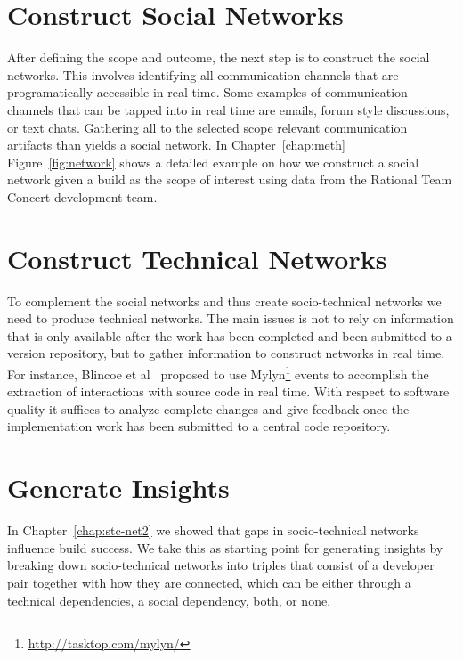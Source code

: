 \section{Construct Social Networks}
After  defining the scope and outcome, the next step is to construct the social networks.
This involves identifying all communication channels that are programatically accessible in real time.
Some examples of communication channels that can be tapped into in real time are emails, forum style discussions, or text chats.
Gathering all to the selected scope relevant communication artifacts than yields a social network.
In Chapter~\ref{chap:meth} Figure~\ref{fig:network} shows a detailed  example on how we construct a social network given a build as the scope of interest using data from the Rational Team Concert development team.

\section{Construct Technical Networks}
To complement the social networks and thus create socio-technical networks we need to produce technical networks.
The main issues is not to rely on information that is only available after the work has been completed and been submitted to a version repository, but to gather information to construct networks in real time.
For instance, Blincoe et al~\cite{blincoe:cscw:2012} proposed to use Mylyn\footnote{\url{http://tasktop.com/mylyn/}} events to accomplish the extraction of interactions with source code in real time.
%
With respect to software quality it suffices to analyze complete changes and give feedback once the implementation work has been submitted to a central code repository.

\section{Generate Insights}
In Chapter~\ref{chap:stc-net2} we showed that gaps in socio-technical networks influence build success.
We take this as starting point for generating insights by breaking down socio-technical networks into triples that consist of a developer pair together with how they are connected, which can be either through a technical dependencies, a social dependency, both, or none.

